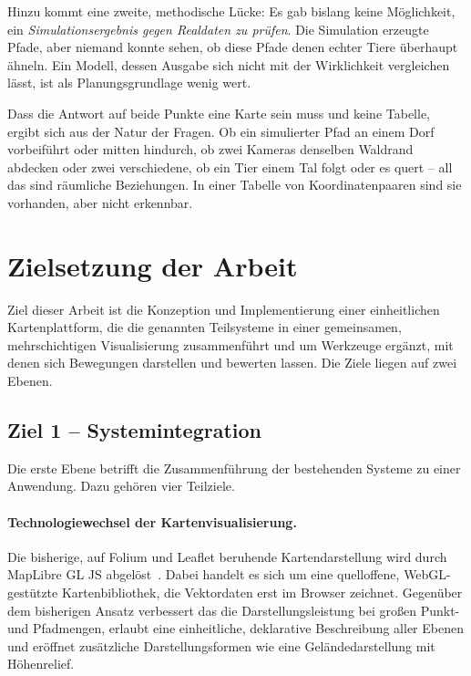\documentclass[12pt,a4paper]{scrreprt}
\begin{document}
Hinzu kommt eine zweite, methodische Lücke: Es gab bislang keine
Möglichkeit, ein \emph{Simulationsergebnis gegen Realdaten zu prüfen}.
Die Simulation erzeugte Pfade, aber niemand konnte sehen, ob diese
Pfade denen echter Tiere überhaupt ähneln. Ein Modell, dessen Ausgabe
sich nicht mit der Wirklichkeit vergleichen lässt, ist als
Planungsgrundlage wenig wert.

Dass die Antwort auf beide Punkte eine Karte sein muss und keine
Tabelle, ergibt sich aus der Natur der Fragen. Ob ein simulierter Pfad
an einem Dorf vorbeiführt oder mitten hindurch, ob zwei Kameras
denselben Waldrand abdecken oder zwei verschiedene, ob ein Tier einem
Tal folgt oder es quert -- all das sind räumliche Beziehungen. In einer
Tabelle von Koordinatenpaaren sind sie vorhanden, aber nicht erkennbar.

\section{Zielsetzung der Arbeit}
\label{sec:zielsetzung}

Ziel dieser Arbeit ist die Konzeption und Implementierung einer
einheitlichen Kartenplattform, die die genannten Teilsysteme in einer
gemeinsamen, mehrschichtigen Visualisierung zusammenführt und um
Werkzeuge ergänzt, mit denen sich Bewegungen darstellen und bewerten
lassen. Die Ziele liegen auf zwei Ebenen.

\subsection*{Ziel 1 -- Systemintegration}

Die erste Ebene betrifft die Zusammenführung der bestehenden Systeme zu
einer Anwendung. Dazu gehören vier Teilziele.

\paragraph{Technologiewechsel der Kartenvisualisierung.}
Die bisherige, auf Folium und Leaflet beruhende Kartendarstellung wird
durch MapLibre GL JS abgelöst~\cite{maplibre}. Dabei handelt es sich um
eine quelloffene, WebGL-gestützte Kartenbibliothek, die Vektordaten
erst im Browser zeichnet. Gegenüber dem bisherigen Ansatz verbessert
das die Darstellungsleistung bei großen Punkt- und Pfadmengen, erlaubt
eine einheitliche, deklarative Beschreibung aller Ebenen und eröffnet
zusätzliche Darstellungsformen wie eine Geländedarstellung mit
Höhenrelief.
\end{document}
